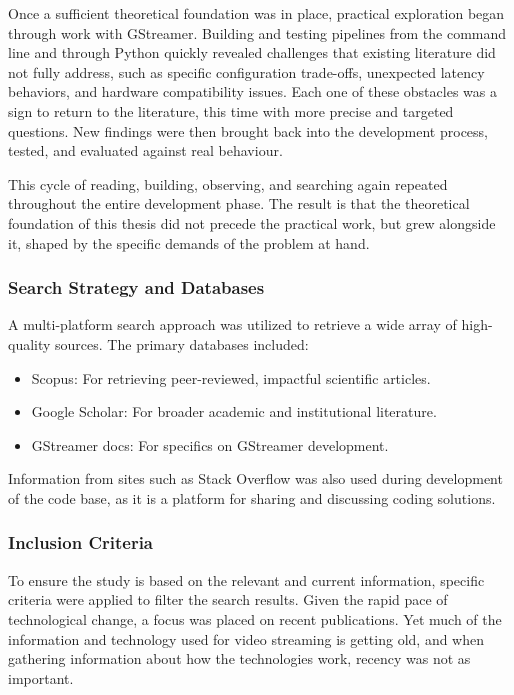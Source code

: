 Once a sufficient theoretical foundation was in place, practical exploration began through work with GStreamer. Building and testing pipelines from the command line and through Python quickly revealed challenges that existing literature did not fully address, such as specific configuration trade-offs, unexpected latency behaviors, and hardware compatibility issues. Each one of these obstacles was a sign to return to the literature, this time with more precise and targeted questions. New findings were then brought back into the development process, tested, and evaluated against real behaviour.

This cycle of reading, building, observing, and searching again repeated throughout the entire development phase. The result is that the theoretical foundation of this thesis did not precede the practical work, but grew alongside it, shaped by the specific demands of the problem at hand.

\subsubsection{Search Strategy and Databases}
A multi-platform search approach was utilized to retrieve a wide array of high-quality sources. The primary databases included:

\begin{itemize}
    \item Scopus: For retrieving peer-reviewed, impactful scientific articles.
    \item Google Scholar: For broader academic and institutional literature.
    \item GStreamer docs: For specifics on GStreamer development.
\end{itemize}

Information from sites such as Stack Overflow was also used during development of the code base, as it is a platform for sharing and discussing coding solutions.

\subsubsection{Inclusion Criteria}
To ensure the study is based on the relevant and current information, specific criteria were applied to filter the search results. Given the rapid pace of technological change, a focus was placed on recent publications. Yet much of the information and technology used for video streaming is getting old, and when gathering information about how the technologies work, recency was not as important.

